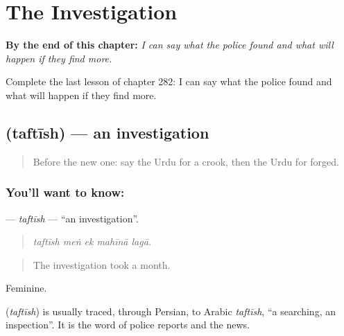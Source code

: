 
\chapter{The Investigation}
\label{ch:ur-the-investigation}

\begin{chapteropening}
\textbf{By the end of this chapter:} \emph{I can say what the police found and what will happen if they find more.}

Complete the last lesson of chapter 282: I can say what the police found and what will happen if they find more.
\end{chapteropening}

\section[\texorpdfstring{\ur{تفتیش} (taftīsh)}{تفتیش (taftīsh)}]{ (taftīsh) — an investigation}

\label{lesson:UR-C282-taftish}



\begin{quote}
Before the new one: say the Urdu for a crook, then the Urdu for forged.
\end{quote}

\subsection*{You'll want to know: }
\textbf{} — \emph{taftīsh} — \textquotedblleft{}an investigation\textquotedblright{}.

\begin{quote}
    
\end{quote}

\begin{quote}
\emph{taftīsh meṅ ek mahīnā lagā.}
\end{quote}

\begin{quote}
The investigation took a month.
\end{quote}

Feminine.

\begin{cousinweb}
\textbf{} (\emph{taftīsh}) is usually traced, through Persian, to Arabic \emph{taftīsh}, \textquotedblleft{}a searching, an inspection\textquotedblright{}. It is the word of police reports and the news.
\end{cousinweb}

